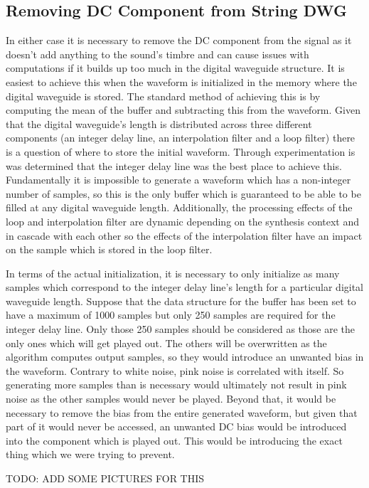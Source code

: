 \documentclass[../main.tex]{subfiles}
\begin{document}
\subsection{Removing DC Component from String DWG}
In either case it is necessary to remove the DC component from the signal as it doesn't add anything to the sound's timbre and can cause issues with computations if it builds up too much in the digital waveguide structure. It is easiest to achieve this when the waveform is initialized in the memory where the digital waveguide is stored. The standard method of achieving this is by computing the mean of the buffer and subtracting this from the waveform. Given that the digital waveguide's length is distributed across three different components (an integer delay line, an interpolation filter and a loop filter) there is a question of where to store the initial waveform. Through experimentation is was determined that the integer delay line was the best place to achieve this. Fundamentally it is impossible to generate a waveform which has a non-integer number of samples, so this is the only buffer which is guaranteed to be able to be filled at any digital waveguide length. Additionally, the processing effects of the loop and interpolation filter are dynamic depending on the synthesis context and in cascade with each other so the effects of the interpolation filter have an impact on the sample which is stored in the loop filter.

In terms of the actual initialization, it is necessary to only initialize as many samples which correspond to the integer delay line's length for a particular digital waveguide length. Suppose that the data structure for the buffer has been set to have a maximum of 1000 samples but only 250 samples are required for the integer delay line. Only those 250 samples should be considered as those are the only ones which will get played out. The others will be overwritten as the algorithm computes output samples, so they would introduce an unwanted bias in the waveform. Contrary to white noise, pink noise is correlated with itself. So generating more samples than is necessary would ultimately not result in pink noise as the other samples would never be played. Beyond that, it would be necessary to remove the bias from the entire generated waveform, but given that part of it would never be accessed, an unwanted DC bias would be introduced into the component which is played out. This would be introducing the exact thing which we were trying to prevent.

TODO: ADD SOME PICTURES FOR THIS
\end{document}
